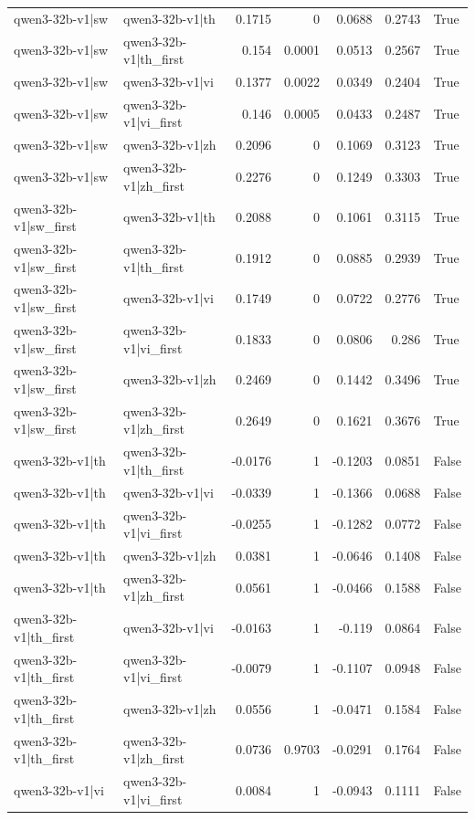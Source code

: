 \begin{table}
\begin{tabular}{l l r r r r l}
qwen3-32b-v1|sw & qwen3-32b-v1|th & 0.1715 & 0 & 0.0688 & 0.2743 & True \\
qwen3-32b-v1|sw & qwen3-32b-v1|th_first & 0.154 & 0.0001 & 0.0513 & 0.2567 & True \\
qwen3-32b-v1|sw & qwen3-32b-v1|vi & 0.1377 & 0.0022 & 0.0349 & 0.2404 & True \\
qwen3-32b-v1|sw & qwen3-32b-v1|vi_first & 0.146 & 0.0005 & 0.0433 & 0.2487 & True \\
qwen3-32b-v1|sw & qwen3-32b-v1|zh & 0.2096 & 0 & 0.1069 & 0.3123 & True \\
qwen3-32b-v1|sw & qwen3-32b-v1|zh_first & 0.2276 & 0 & 0.1249 & 0.3303 & True \\
qwen3-32b-v1|sw_first & qwen3-32b-v1|th & 0.2088 & 0 & 0.1061 & 0.3115 & True \\
qwen3-32b-v1|sw_first & qwen3-32b-v1|th_first & 0.1912 & 0 & 0.0885 & 0.2939 & True \\
qwen3-32b-v1|sw_first & qwen3-32b-v1|vi & 0.1749 & 0 & 0.0722 & 0.2776 & True \\
qwen3-32b-v1|sw_first & qwen3-32b-v1|vi_first & 0.1833 & 0 & 0.0806 & 0.286 & True \\
qwen3-32b-v1|sw_first & qwen3-32b-v1|zh & 0.2469 & 0 & 0.1442 & 0.3496 & True \\
qwen3-32b-v1|sw_first & qwen3-32b-v1|zh_first & 0.2649 & 0 & 0.1621 & 0.3676 & True \\
qwen3-32b-v1|th & qwen3-32b-v1|th_first & -0.0176 & 1 & -0.1203 & 0.0851 & False \\
qwen3-32b-v1|th & qwen3-32b-v1|vi & -0.0339 & 1 & -0.1366 & 0.0688 & False \\
qwen3-32b-v1|th & qwen3-32b-v1|vi_first & -0.0255 & 1 & -0.1282 & 0.0772 & False \\
qwen3-32b-v1|th & qwen3-32b-v1|zh & 0.0381 & 1 & -0.0646 & 0.1408 & False \\
qwen3-32b-v1|th & qwen3-32b-v1|zh_first & 0.0561 & 1 & -0.0466 & 0.1588 & False \\
qwen3-32b-v1|th_first & qwen3-32b-v1|vi & -0.0163 & 1 & -0.119 & 0.0864 & False \\
qwen3-32b-v1|th_first & qwen3-32b-v1|vi_first & -0.0079 & 1 & -0.1107 & 0.0948 & False \\
qwen3-32b-v1|th_first & qwen3-32b-v1|zh & 0.0556 & 1 & -0.0471 & 0.1584 & False \\
qwen3-32b-v1|th_first & qwen3-32b-v1|zh_first & 0.0736 & 0.9703 & -0.0291 & 0.1764 & False \\
qwen3-32b-v1|vi & qwen3-32b-v1|vi_first & 0.0084 & 1 & -0.0943 & 0.1111 & False \\

\end{tabular}
\end{table}

